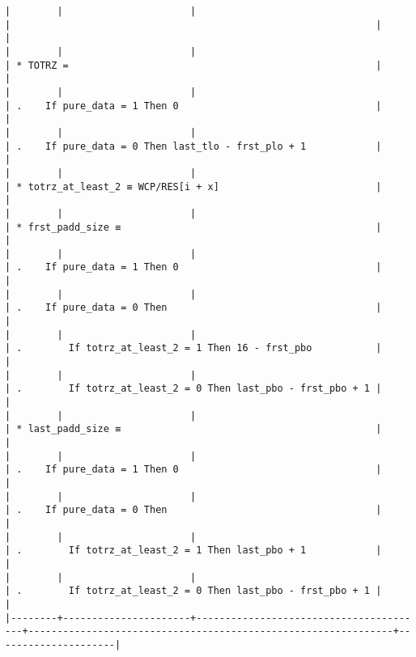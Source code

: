 \documentclass[varwidth=\maxdimen,margin=0.5cm,multi={verbatim}]{standalone}
\begin{document}
\begin{verbatim}
|        |                      |                                        |                                                               |                     |
|        |                      |                                        | * TOTRZ =                                                     |                     |
|        |                      |                                        | .    If pure_data = 1 Then 0                                  |                     |
|        |                      |                                        | .    If pure_data = 0 Then last_tlo - frst_plo + 1            |                     |
|        |                      |                                        | * totrz_at_least_2 ≡ WCP/RES[i + x]                           |                     |
|        |                      |                                        | * frst_padd_size ≡                                            |                     |
|        |                      |                                        | .    If pure_data = 1 Then 0                                  |                     |
|        |                      |                                        | .    If pure_data = 0 Then                                    |                     |
|        |                      |                                        | .        If totrz_at_least_2 = 1 Then 16 - frst_pbo           |                     |
|        |                      |                                        | .        If totrz_at_least_2 = 0 Then last_pbo - frst_pbo + 1 |                     |
|        |                      |                                        | * last_padd_size ≡                                            |                     |
|        |                      |                                        | .    If pure_data = 1 Then 0                                  |                     |
|        |                      |                                        | .    If pure_data = 0 Then                                    |                     |
|        |                      |                                        | .        If totrz_at_least_2 = 1 Then last_pbo + 1            |                     |
|        |                      |                                        | .        If totrz_at_least_2 = 0 Then last_pbo - frst_pbo + 1 |                     |
|--------+----------------------+----------------------------------------+---------------------------------------------------------------+---------------------|


\end{verbatim}
\end{document}
